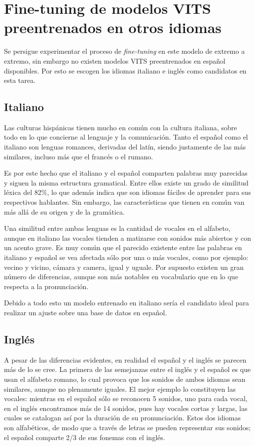 	
\section{Fine-tuning de modelos VITS preentrenados en otros idiomas} \label{it-en}

Se persigue experimentar el proceso de \textit{fine-tuning} en este modelo de extremo a extremo, sin embargo no existen modelos VITS preentrenados en español disponibles. Por esto se escogen los idiomas italiano e inglés como candidatos en esta tarea.

\subsection{Italiano} 
Las culturas hispánicas tienen mucho en común con la cultura italiana, sobre todo en lo que concierne al lenguaje y la comunicación. Tanto el español como el italiano son lenguas romances, derivadas del latín, siendo justamente de las más similares, incluso más que el francés o el rumano.

Es por este hecho que el italiano y el español comparten palabras muy parecidas y siguen la misma estructura gramatical. Entre ellos existe un grado de similitud léxica del 82$\%$, lo que además indica que son idiomas fáciles de aprender para sus respectivos hablantes. Sin embargo, las características que tienen en común van más allá de su origen y de la gramática.

Una similitud entre ambas lenguas es la cantidad de vocales en el alfabeto, aunque en italiano las vocales tienden a matizarse con sonidos más abiertos y con un acento grave. Es muy común que el parecido existente entre las palabras en italiano y español se vea afectada sólo por una o más vocales, como por ejemplo: vecino y vicino, cámara y camera, igual y uguale. Por supuesto existen un gran número de diferencias, aunque son más notables en vocabulario que en lo que respecta a la pronunciación. 

Debido a todo esto un modelo entrenado en italiano sería el candidato ideal para realizar un ajuste sobre una base de datos en español. 
\subsection{Inglés}

A pesar de las diferencias evidentes, en realidad el español y el inglés se parecen más de lo se cree. La primera de las semejanzas entre el inglés y el español es que usan el alfabeto romano, lo cual provoca que los sonidos de ambos idiomas sean similares, aunque no plenamente iguales. El mejor ejemplo lo constituyen las vocales: mientras en el español sólo se reconocen 5 sonidos, uno para cada vocal, en el inglés encontramos más de 14 sonidos, pues hay vocales cortas y largas, las cuales se catalogan así por la duración de su pronunciación. Estos dos idiomas son alfabéticos, de modo que a través de letras se pueden representar sus sonidos; el español comparte 2/3 de sus fonemas con el inglés.

